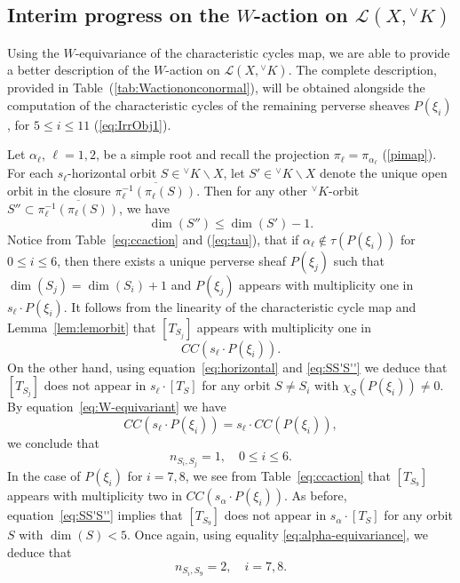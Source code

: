 \documentclass[a4paper, 11pt]{article}
\begin{document}
\subsection{Interim progress on the $W$-action on $\mathscr{L}(X, {^\vee}K)$}

Using the $W$-equivariance of the characteristic cycles map, we are
able to provide a better description of the $W$-action 
on $\mathscr{L}(X, {^\vee}K)$. 
The complete description, provided in
Table~(\ref{tab:Wactiononconormal}), will be obtained alongside the
computation of the characteristic cycles of the remaining perverse
sheaves $P(\xi_i)$, for $5\leq i\leq 11$ (\ref{eq:IrrObj1}). 


Let $\alpha_{\ell}$, $\ell = 1,2$, be a simple root and recall the
projection $\pi_{\ell} = \pi_{\alpha_{\ell}}$  (\ref{pimap}).  For each
$s_{\ell}$-horizontal orbit $S \in {^\vee}K \backslash X$, let 
$S'  \in  {^\vee}K \backslash X$ denote the unique
open orbit in the closure
$\overline{\pi_{\ell}^{-1}(\pi_{\ell}(S))}$. Then for any other ${^\vee}K$-orbit
$S'' \subset \overline{\pi_{\ell}^{-1}(\pi_{\ell}(S))}$, we have 
\begin{equation}\label{eq:SS'S''}
\dim(S'') \leq \dim(S') - 1.
\end{equation} 
Notice from Table~\ref{eq:ccaction} and (\ref{eq:tau}), that  
if $\alpha_{\ell} \notin \tau(P(\xi_{i}))$ for $0 \leq i \leq 6$, 
then there exists a unique perverse sheaf $P(\xi_j)$ 
such that $\dim(S_j) = \dim(S_{i}) + 1$ and $P(\xi_j)$ appears with
multiplicity one in $s_{\ell} \cdot P(\xi_{i})$. 
It follows from the linearity of the characteristic cycle map and
Lemma~\ref{lem:lemorbit} that $[T_{S_j}]$ appears with multiplicity
one in  
\[
CC(s_{\ell} \cdot P(\xi_{i})).
\]
On the other hand, using equation~\eqref{eq:horizontal} and 
\eqref{eq:SS'S''} we deduce that $[T_{S_j}]$ does not appear in
$s_{\ell} \cdot [T_S]$ 
for any orbit $S \neq S_{i}$ with $\chi_S(P(\xi_{i})) \neq 0$. 
By equation~\eqref{eq:W-equivariant} we have
\begin{equation}\label{eq:alpha-equivariance}
CC(s_{\ell} \cdot P(\xi_{i})) = s_{\ell} \cdot CC(P(\xi_{i})),
\end{equation}
we conclude that
\begin{equation}\label{eq:nSiSj=1}
n_{S_{i}, S_j} = 1, \quad 0 \leq i \leq 6.
\end{equation}
In the case of $P(\xi_i)$ for $i = 7, 8$, we see from 
Table~\ref{eq:ccaction} that $[T_{S_9}]$ appears with multiplicity two in 
$CC(s_\alpha \cdot P(\xi_i))$. As before, equation~\eqref{eq:SS'S''} 
implies that $[T_{S_9}]$ does not appear in $s_\alpha \cdot [T_S]$ 
for any orbit $S$ with $\dim(S) < 5$. Once again, using equality 
\eqref{eq:alpha-equivariance}, we deduce that
\begin{equation}\label{eq:nSiS9=2}
n_{S_i, S_9} = 2,\quad i=7,8.
\end{equation}
 
\end{document}
